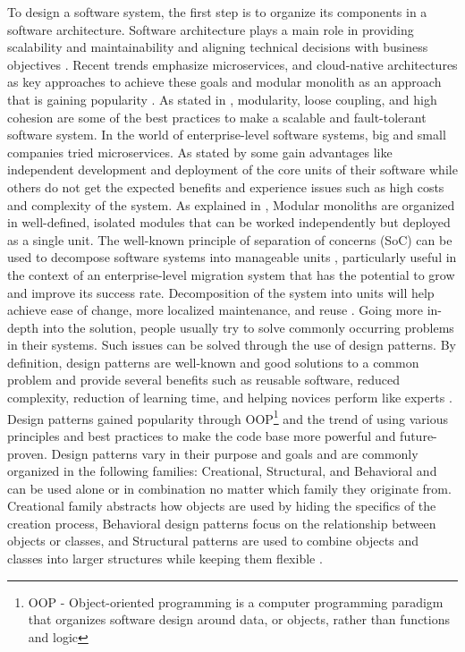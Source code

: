 \documentclass{article}
\begin{document}
\begin{multicols}{2}
To design a software system, the first step is to organize its components in a software architecture. Software architecture plays a main role in providing scalability and maintainability and aligning technical decisions with business objectives \cite{Nivedhaa-2024}. Recent trends emphasize microservices, and cloud-native architectures as key approaches to achieve these goals \cite{Nivedhaa-2024} and modular monolith as an approach that is gaining popularity \cite{SuEtAl-2024}. As stated in \cite{Nivedhaa-2024}, modularity, loose coupling, and high cohesion are some of the best practices to make a scalable and fault-tolerant software system. In the world of enterprise-level software systems, big and small companies tried microservices. As stated by \cite{SuEtAl-2024} some gain advantages like independent development and deployment of the core units of their software while others do not get the expected benefits and experience issues such as high costs and complexity of the system. As explained in \cite{SuEtAl-2024}, Modular monoliths are organized in well-defined, isolated modules that can be worked independently but deployed as a single unit. The well-known principle of separation of concerns (SoC) can be used to decompose software systems into manageable units \cite{Daga-2006}, particularly useful in the context of an enterprise-level migration system that has the potential to grow and improve its success rate. Decomposition of the system into units will help achieve ease of change, more localized maintenance, and reuse \cite{Daga-2006}. Going more in-depth into the solution, people usually try to solve commonly occurring problems in their systems. Such issues can be solved through the use of design patterns. By definition, design patterns are well-known and good solutions to a common problem \cite{Martin-2000} and provide several benefits such as reusable software, reduced complexity, reduction of learning time, and helping novices perform like experts \cite{GammaEtAl-1993}. Design patterns gained popularity through OOP\footnote{OOP - Object-oriented programming is a computer programming paradigm that organizes software design around data, or objects, rather than functions and logic} and the trend of using various principles and best practices to make the code base more powerful and future-proven. Design patterns vary in their purpose and goals and are commonly organized in the following families: Creational, Structural, and Behavioral \cite{GammaEtAl-1993} and can be used alone or in combination no matter which family they originate from. Creational family abstracts how objects are used by hiding the specifics of the creation process, Behavioral design patterns focus on the relationship between objects or classes, and Structural patterns are used to combine objects and classes into larger structures while keeping them flexible \cite{GammaEtAl-1993}. 


\end{multicols}
\end{document}
